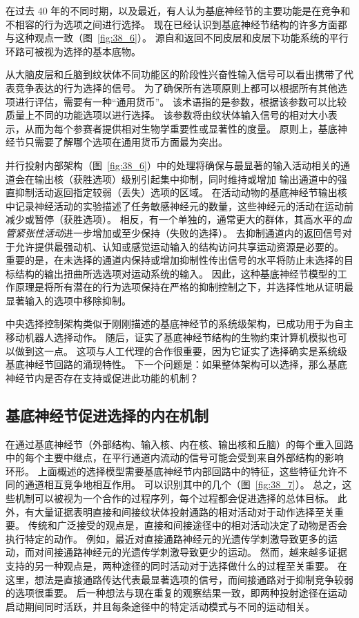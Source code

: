 在过去 40 年的不同时期，以及最近，有人认为基底神经节的主要功能是在竞争和不相容的行为选项之间进行选择。
现在已经认识到基底神经节结构的许多方面都与这种观点一致（图~\ref{fig:38_6}）。
源自和返回不同皮层和皮层下功能系统的平行环路可被视为选择的基本底物。


从大脑皮层和丘脑到纹状体不同功能区的阶段性兴奋性输入信号可以看出携带了代表竞争表达的行为选择的信号。
为了确保所有选项原则上都可以根据所有其他选项进行评估，需要有一种“通用货币”。
该术语指的是参数，根据该参数可以比较质量上不同的功能选项以进行选择。
该参数将由纹状体输入信号的相对大小表示，从而为每个参赛者提供相对生物学重要性或显著性的度量。
原则上，基底神经节只需要了解哪个选项在通用货币方面最为突出。


并行投射内部架构（图~\ref{fig:38_6}）中的处理将确保与最显著的输入活动相关的通道会在输出核（获胜选项）级别引起集中抑制，同时维持或增加 输出通道中的强直抑制活动返回指定较弱（丢失）选项的区域。
在活动动物的基底神经节输出核中记录神经活动的实验描述了任务敏感神经元的数量，这些神经元的活动在运动前减少或暂停（获胜选项）。
相反，有一个单独的，通常更大的群体，其高水平的\textit{血管紧张性活动}进一步增加或至少保持（失败的选择）。
去抑制通道内的返回信号对于允许提供最强动机、认知或感觉运动输入的结构访问共享运动资源是必要的。
重要的是，在未选择的通道内保持或增加抑制性传出信号的水平将防止未选择的目标结构的输出扭曲所选选项对运动系统的输入。
因此，这种基底神经节模型的工作原理是将所有潜在的行为选项保持在严格的抑制控制之下，并选择性地从证明最显著输入的选项中移除抑制。


中央选择控制架构类似于刚刚描述的基底神经节的系统级架构，已成功用于为自主移动机器人选择动作。
随后，证实了基底神经节结构的生物约束计算机模拟也可以做到这一点。
这项与人工代理的合作很重要，因为它证实了选择确实是系统级基底神经节回路的涌现特性。
下一个问题是：如果整体架构可以选择，那么基底神经节内是否存在支持或促进此功能的机制？


\subsection{基底神经节促进选择的内在机制}

在通过基底神经节（外部结构、输入核、内在核、输出核和丘脑）的每个重入回路中的每个主要中继点，在平行通道内流动的信号可能会受到来自外部结构的影响 环形。
上面概述的选择模型需要基底神经节内部回路中的特征，这些特征允许不同的通道相互竞争地相互作用。
可以识别其中的几个（图~\ref{fig:38_7}）。
总之，这些机制可以被视为一个合作的过程序列，每个过程都会促进选择的总体目标。
此外，有大量证据表明直接和间接纹状体投射通路的相对活动对于动作选择至关重要。
传统和广泛接受的观点是，直接和间接途径中的相对活动决定了动物是否会执行特定的动作。
例如，最近对直接通路神经元的光遗传学刺激导致更多的运动，而对间接通路神经元的光遗传学刺激导致更少的运动。
然而，越来越多证据支持的另一种观点是，两种途径的同时活动对于选择做什么的过程至关重要。
在这里，想法是直接通路传达代表最显著选项的信号，而间接通路对于抑制竞争较弱的选项很重要。
后一种想法与现在重复的观察结果一致，即两种投射途径在运动启动期间同时活跃，并且每条途径中的特定活动模式与不同的运动相关。




